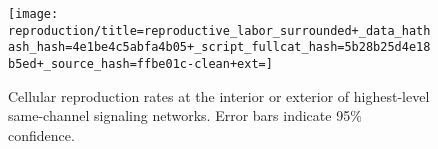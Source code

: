 \begin{figure}[!htbp]
\begin{center}

\texttt{[image: reproduction/title=reproductive\_labor\_surrounded+\_data\_hathash\_hash=4e1be4c5abfa4b05+\_script\_fullcat\_hash=5b28b25d4e18b5ed+\_source\_hash=ffbe01c-clean+ext=]}

\caption{
Cellular reproduction rates at the interior or exterior of highest-level same-channel signaling networks.
Error bars indicate 95\% confidence.
}
\label{fig:reproduction_surrounded}
\end{center}
\end{figure}
